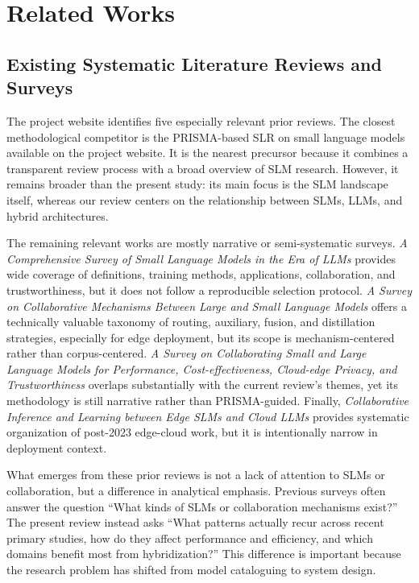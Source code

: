 \section{Related Works}
\subsection{Existing Systematic Literature Reviews and Surveys}
The project website identifies five especially relevant prior reviews. The closest methodological competitor is the PRISMA-based SLR on small language models available on the project website. It is the nearest precursor because it combines a transparent review process with a broad overview of SLM research. However, it remains broader than the present study: its main focus is the SLM landscape itself, whereas our review centers on the relationship between SLMs, LLMs, and hybrid architectures.

The remaining relevant works are mostly narrative or semi-systematic surveys. \emph{A Comprehensive Survey of Small Language Models in the Era of LLMs} provides wide coverage of definitions, training methods, applications, collaboration, and trustworthiness, but it does not follow a reproducible selection protocol. \emph{A Survey on Collaborative Mechanisms Between Large and Small Language Models} offers a technically valuable taxonomy of routing, auxiliary, fusion, and distillation strategies, especially for edge deployment, but its scope is mechanism-centered rather than corpus-centered. \emph{A Survey on Collaborating Small and Large Language Models for Performance, Cost-effectiveness, Cloud-edge Privacy, and Trustworthiness} overlaps substantially with the current review's themes, yet its methodology is still narrative rather than PRISMA-guided. Finally, \emph{Collaborative Inference and Learning between Edge SLMs and Cloud LLMs} provides systematic organization of post-2023 edge-cloud work, but it is intentionally narrow in deployment context.

What emerges from these prior reviews is not a lack of attention to SLMs or collaboration, but a difference in analytical emphasis. Previous surveys often answer the question ``What kinds of SLMs or collaboration mechanisms exist?'' The present review instead asks ``What patterns actually recur across recent primary studies, how do they affect performance and efficiency, and which domains benefit most from hybridization?'' This difference is important because the research problem has shifted from model cataloguing to system design.

